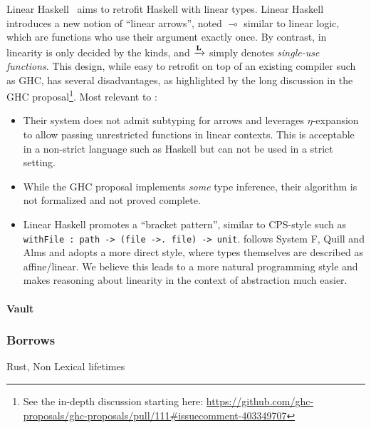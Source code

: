 Linear Haskell~\citep{DBLP:journals/pacmpl/BernardyBNJS18} aims
to retrofit Haskell with linear types.
Linear Haskell introduces a new notion
of ``linear arrows'', noted $\multimap$ similar to linear logic,
which are functions who use their argument exactly once.
By contrast, in \lang linearity is only decided
by the kinds, and ${\xrightarrow{\mathbf{L}}}$ simply denotes \emph{single-use functions}.
This design, while easy to retrofit on top of an existing compiler
such as GHC, has several disadvantages,
as highlighted by the long discussion in the GHC proposal\footnote{
  See the in-depth discussion starting here: \url{https://github.com/ghc-proposals/ghc-proposals/pull/111\#issuecomment-403349707}}.
Most relevant to \lang:
\begin{itemize}
\item Their system does not admit subtyping for arrows and leverages
  $\eta$-expansion to allow passing unrestricted functions in linear
  contexts. This is acceptable in a non-strict language such as
  Haskell but can not be used in a strict setting.
\item
  While the GHC proposal implements \emph{some} type inference,
  their algorithm is not formalized and not proved complete.
\item
  Linear Haskell promotes a ``bracket pattern'', similar to CPS-style such as 
  \lstinline/withFile : path -> (file ->. file) -> unit/.
  \lang follows System F\degree, Quill and Alms and
  adopts a more direct style, where types themselves are
  described as affine/linear.
  We believe this leads to a more natural programming style
  and makes reasoning about linearity in the context of abstraction much easier.
\end{itemize}

\paragraph{Vault\citep{DBLP:conf/pldi/DeLineF01,DBLP:conf/pldi/FahndrichD02}}

\subsubsection{Borrows}

Rust, Non Lexical lifetimes

